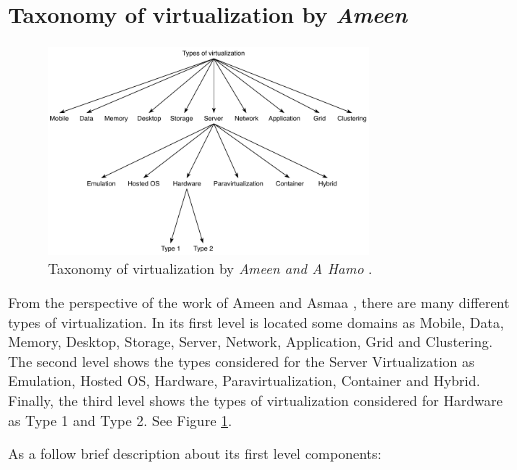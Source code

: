 	\subsection{Taxonomy of virtualization by \textit{Ameen}}
	
	\begin{figure}[H]
		\centering
		\includegraphics[width=8.5cm]{images/AmeenAndHamo2003.pdf}
		\caption{Taxonomy of virtualization by \textit{Ameen and A Hamo} \cite{Ameen2013}.} 
		\label{fig:TaxonomyOfVirtualizationByAmeen}
	\end{figure}



    From the perspective of the work of Ameen and Asmaa \cite{Ameen2013}, there are many different types of virtualization. In its first level is located some domains as  Mobile, Data, Memory, Desktop, Storage, Server, Network, Application, Grid and Clustering. The second level shows the types considered for the Server Virtualization as Emulation, Hosted OS, Hardware, Paravirtualization, Container and Hybrid. Finally, the third level shows the types of virtualization considered for Hardware as Type 1 and Type 2. See Figure \ref{fig:TaxonomyOfVirtualizationByAmeen}.
    
    As a follow brief description about its first level components:
    
